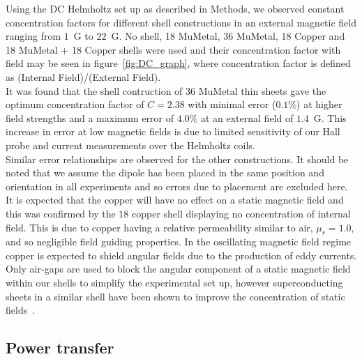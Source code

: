\documentclass[11pt]{iopart}
\begin{document}
Using the DC Helmholtz set up as described in Methods, we observed
constant concentration factors for different shell constructions in an
external magnetic field ranging from $1$~G to $22$~G. No shell, 18
MuMetal, 36 MuMetal, 18 Copper and 18 MuMetal + 18 Copper shells were
used and their concentration factor with field may be seen in
figure~\ref{fig:DC_graph}, where concentration factor is defined as
(Internal Field)/(External Field). \\ It was found that the shell
contruction of 36 MuMetal thin sheets gave the optimum concentration
factor of $C = 2.38$ with minimal error ($0.1\%$) at higher field
strengths and a maximum error of $4.0\%$ at an external field of
$1.4$~G. This increase in error at low magnetic fields is due to
limited sensitivity of our Hall probe and current measurements over
the Helmholtz coils.\\ Similar error relationships are observed for
the other constructions. It should be noted that we assume the dipole
has been placed in the same position and orientation in all
experiments and so errors due to placement are excluded here.\\ It is
expected that the copper will have no effect on a static magnetic
field and this was confirmed by the $18$ copper shell displaying no
concentration of internal field.  This is due to copper having a
relative permeability similar to air, $\mu_r = 1.0$, and so negligible
field guiding properties. In the oscillating magnetic field regime
copper is expected to shield angular fields due to the production of
eddy currents. Only air-gaps are used to block the angular component
of a static magnetic field within our shells to simplify the
experimental set up, however superconducting sheets in a similar shell
have been shown to improve the concentration of static
fields~\cite{PRATT}.\\



\subsection{Power transfer}
\end{document}
